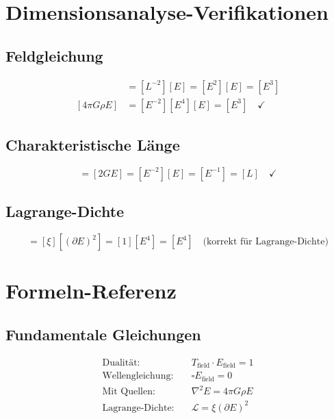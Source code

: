 	\section{Dimensionsanalyse-Verifikationen}
	\label{sec:dimensional_analysis}
	
	\subsection{Feldgleichung}
	
	\begin{align}
		[\nabla^2 E] &= [L^{-2}][E] = [E^2][E] = [E^3] \\
		[4\pi G \rho E] &= [E^{-2}][E^4][E] = [E^3] \quad \checkmark
	\end{align}
	
	\subsection{Charakteristische Länge}
	
	\begin{equation}
		[r_0] = [2GE] = [E^{-2}][E] = [E^{-1}] = [L] \quad \checkmark
	\end{equation}
	
	\subsection{Lagrange-Dichte}
	
	\begin{equation}
		[\mathcal{L}] = [\xi][(\partial E)^2] = [1][E^4] = [E^4] \quad \text{(korrekt für Lagrange-Dichte)}
	\end{equation}
	
	\section{Formeln-Referenz}
	\label{sec:formula_reference}
	
	\subsection{Fundamentale Gleichungen}
	
	\begin{align}
		\text{Dualität:} \quad & T_{\text{field}} \cdot E_{\text{field}} = 1 \\
		\text{Wellengleichung:} \quad & \square E_{\text{field}} = 0 \\
		\text{Mit Quellen:} \quad & \nabla^2 E = 4\pi G \rho E \\
		\text{Lagrange-Dichte:} \quad & \mathcal{L} = \xi (\partial E)^2
	\end{align}
	
